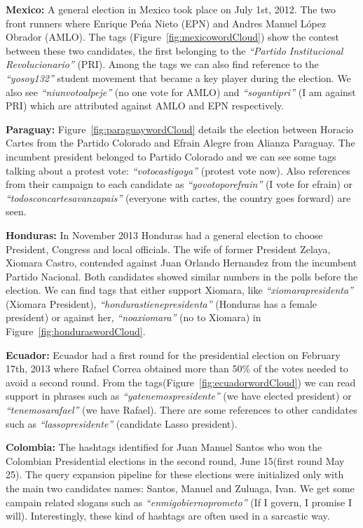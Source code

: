 \noindent	
{\bf Mexico:} A general election in Mexico took place on July 1st, 2012.
The two front runners where Enrique Pe\'{n}a Nieto (EPN) and Andres Manuel L\'{o}pez Obrador (AMLO).
The tags (Figure~\ref{fig:mexicowordCloud}) show the contest between these two candidates, the first belonging to the \emph{“Partido Institucional Revolucionario”} (PRI). 
Among the tags we can also find reference to the \emph{“yosoy132”} student movement that became a key player during the election. 
We also see \emph{“niunvotoalpeje”} (no one vote for AMLO) and \emph{“soyantipri”} (I am against PRI) which are attributed against AMLO and EPN respectively.

\noindent
{\bf Paraguay:}
Figure~\ref{fig:paraguaywordCloud} details the election between Horacio Cartes from the Partido Colorado and Efrain Alegre from Alianza Paraguay. 
The incumbent president belonged to Partido Colorado and we can see some tags talking about a protest vote: \emph{“votocastigoya”} (protest vote now). 
Also references from their campaign to each candidate as \emph{“yovotoporefrain”} (I vote for efrain) or \emph{“todosconcartesavanzapais”} (everyone with cartes, the country goes forward) are seen.

\noindent
{\bf Honduras:}
In November 2013 Honduras had a general election to choose President, Congress and local officials. 
The wife of former President Zelaya, Xiomara Castro, contended against Juan Orlando Hernandez from the incumbent Partido Nacional. 
Both candidates showed similar numbers in the polls before the election. 
We can find tags that either support Xiomara, like \emph{“xiomarapresidenta”} (Xiomara President), \emph{“hondurastienepresidenta”} (Honduras has a female president) or against her, \emph{“noaxiomara”} (no to Xiomara) in Figure~\ref{fig:honduraswordCloud}.

\noindent
{\bf Ecuador:}
Ecuador had a first round for the presidential election on February 17th, 2013 where Rafael Correa obtained more than 50\% of the votes needed to avoid a second round. 
From the tags(Figure~\ref{fig:ecuadorwordCloud}) we can read support in phrases such as \emph{“yatenemospresidente”} (we have elected president) or \emph{“tenemosarafael”} (we have Rafael). 
There are some references to other candidates such as \emph{“lassopresidente”} (candidate Lasso president).

\noindent
{\bf Colombia:}
The hashtags identified for Juan Manuel Santos who won the Colombian Presidential elections in the second round,
June 15(first round May 25). The query expansion pipeline for these elections were initialized only with the main two candidates names: Santos, Manuel and Zuluaga, Ivan. We get some campain related slogans such as \emph{``enmigobiernoprometo''} (If I govern, I promise I will). Interestingly, these kind of hashtags are often used in a sarcastic way.

